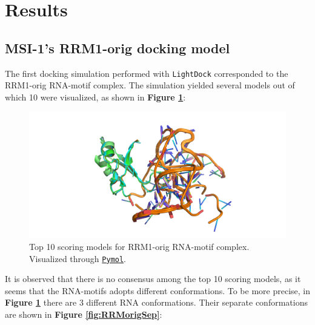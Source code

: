 \section{Results}


\subsection{MSI-1's RRM1-orig docking model}

The first docking simulation performed with \texttt{LightDock} corresponded to the RRM1-orig RNA-motif complex. The simulation yielded several models out of which 10 were visualized, as shown in \textbf{Figure \ref{fig:allRRMorig}}:

\begin{figure}[htbp!]
    \centering
    \includegraphics[width=0.82\linewidth]{assets/RMM1_orig_ALL.png}
    \caption[Top 10 scoring models for RRM1-orig RNA-motif complex.]{Top 10 scoring models for RRM1-orig RNA-motif complex. Visualized through \href{https://pymol.org/2/}{\texttt{Pymol}}.}
    \label{fig:allRRMorig}
\end{figure}

It is observed that there is no consensus among the top 10 scoring models, as it seems that the RNA-motifs adopts different conformations. To be more precise, in \textbf{Figure \ref{fig:allRRMorig}} there are 3 different RNA conformations. Their separate conformations are shown in \textbf{Figure \ref{fig:RRMorigSep}}:

